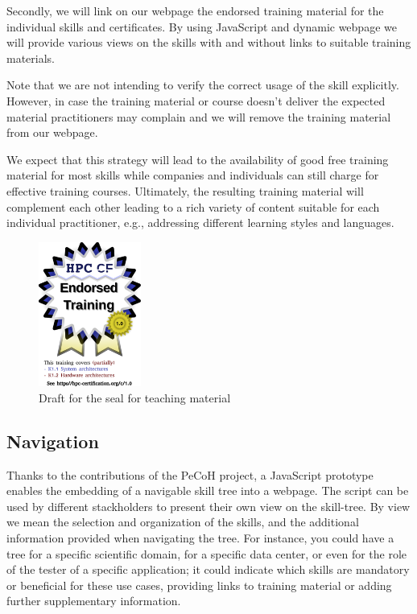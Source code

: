\documentclass[jocse]{jocseart}
\begin{document}
Secondly, we will link on our webpage the endorsed training material for the individual skills and certificates.
By using JavaScript and dynamic webpage we will provide various views on the skills with and without links to suitable training materials.

Note that we are not intending to verify the correct usage of the skill explicitly.
However, in case the training material or course doesn't deliver the expected material practitioners may complain and we will remove the training material from our webpage.

We expect that this strategy will lead to the availability of good free training material for most skills while companies and individuals can still charge for effective training courses.
Ultimately, the resulting training material will complement each other leading to a rich variety of content suitable for each individual practitioner, e.g., addressing different learning styles and languages.

\begin{figure}
  \includegraphics[width=0.3\textwidth]{certified}
  \caption{Draft for the seal for teaching material}
  \label{fig:seal-teaching}
\end{figure}


\subsection{Navigation}
Thanks to the contributions of the PeCoH project, a JavaScript prototype enables the embedding of a navigable skill tree into a webpage.
The script can be used by different stackholders to present their own view on the skill-tree.
By view we mean the selection and organization of the skills, and the additional information provided when navigating the tree.
For instance, you could have a tree for a specific scientific domain, for a specific data center, or even for the role of the tester of a specific application; it could indicate which skills are mandatory or beneficial for these use cases, providing links to training material or adding further supplementary information.
\end{document}
